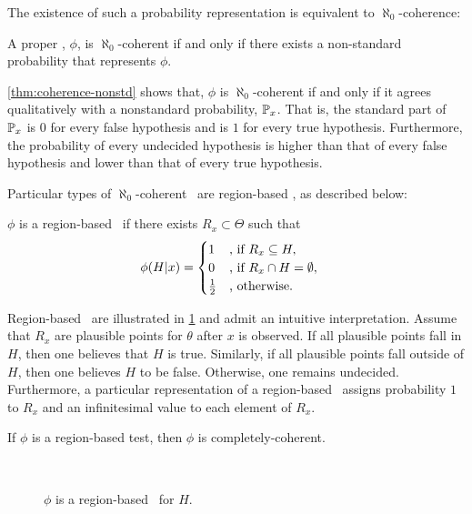 The existence of such a probability representation
is equivalent to $\aleph_0$-coherence:

\begin{theorem}
 \label{thm:coherence-nonstd}
 A proper \summ, $\phi$, is 
 $\aleph_0$-coherent
 if and only if
 there exists a non-standard probability
 that represents $\phi$. 
\end{theorem}

\cref{thm:coherence-nonstd} shows that,
$\phi$ is $\aleph_0$-coherent
if and only if
it agrees qualitatively with
a nonstandard probability, $\P_x$.
That is, the standard part of $\P_x$ is $0$
for every false  hypothesis and is $1$
for every true hypothesis.
Furthermore, the probability of 
every undecided hypothesis is
higher than that of every false hypothesis and
lower than that of every true hypothesis.

Particular types of $\aleph_0$-coherent \summs \ are region-based \summs, as described below:

\begin{definition}
 \label{def:region-based}
 $\phi$ is a region-based \summ \ if
 there exists $R_x \subset \Theta$ such that
 \begin{align*}
  \phi(H|x) &=
  \begin{cases}
   1 & \text{, if } R_x \subseteq H, \\
   0 & \text{, if } R_x \cap H = \emptyset, \\
   \half & \text{, otherwise.}
  \end{cases}
 \end{align*}
\end{definition}

Region-based \summs \ are illustrated
in \cref{fig::region} and
admit an intuitive interpretation. 
Assume that $R_x$ are
plausible points for $\theta$ 
after $x$ is observed.
If all plausible points fall in $H$,
then one believes that $H$ is true.
Similarly, if all plausible points
fall outside of $H$, then
one believes $H$ to be false.
Otherwise, one remains undecided.
Furthermore, a particular representation
of a region-based \summ \ assigns
probability $1$ to $R_x$ and
an infinitesimal value to each element of $R_x$.

\begin{lemma}
 \label{thm:region-is-coherent}
 If $\phi$ is a region-based test,
 then $\phi$ is completely-coherent.
\end{lemma}

\begin{figure}
  \center
  \gfbstfig
  \mbox{} \vspace{-2mm} \mbox{} \\ 
  \caption{$\phi$ is
  a region-based \summ \ for $H$.}
  \label{fig::region}
\end{figure}

